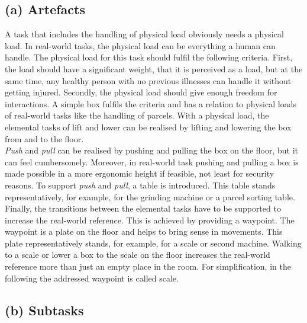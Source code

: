 \subsection{(a) Artefacts}
A task that includes the handling of physical load obviously needs a physical load. In real-world tasks, the physical load can be everything a human can handle. The physical load for this task should fulfil the following criteria. First, the load should have a significant weight, that it is perceived as a load, but at the same time, any healthy person with no previous illnesses can handle it without getting injured. Secondly, the physical load should give enough freedom for interactions. A simple box fulfils the criteria and has a relation to physical loads of real-world tasks like the handling of parcels. With a physical load, the elemental tasks of lift and lower can be realised by lifting and lowering the box from and to the floor.\\
\textit{Push} and \textit{pull} can be realised by pushing and pulling the box on the floor, but it can feel cumbersomely. Moreover, in real-world task pushing and pulling a box is made possible in a more ergonomic height if feasible, not least for security reasons. To support \textit{push} and \textit{pull}, a table is introduced. This table stands representatively, for example, for the grinding machine or a parcel sorting table.\\
Finally, the transitions between the elemental tasks have to be supported to increase the real-world reference. This is achieved by providing a waypoint. The waypoint is a plate on the floor and helps to bring sense in movements. This plate representatively stands, for example, for a scale or second machine. Walking to a scale or lower a box to the scale on the floor increases the real-world reference more than just an empty place in the room. For simplification, in the following the addressed waypoint is called scale.

\subsection{(b) Subtasks}
\label{sec:subTasks}

